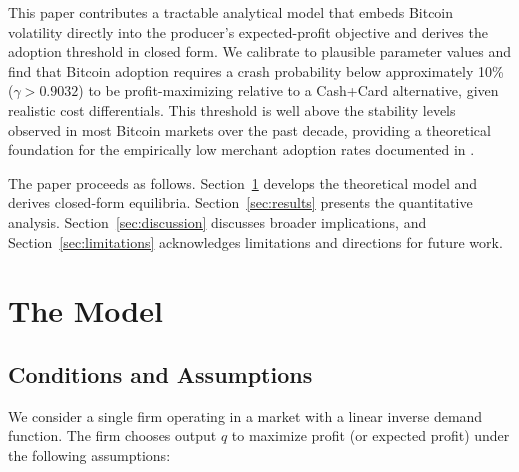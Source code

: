 \documentclass{article}
\begin{document}
This paper contributes a tractable analytical model that embeds Bitcoin
volatility directly into the producer's expected-profit objective and derives
the adoption threshold in closed form.
We calibrate to plausible parameter values and find that Bitcoin adoption
requires a crash probability below approximately 10\% ($\gamma > 0.9032$) to
be profit-maximizing relative to a Cash+Card alternative, given realistic cost
differentials.
This threshold is well above the stability levels observed in most Bitcoin
markets over the past decade, providing a theoretical foundation for the
empirically low merchant adoption rates documented in \citet{catalini2016}.

The paper proceeds as follows.
Section~\ref{sec:model} develops the theoretical model and derives
closed-form equilibria.
Section~\ref{sec:results} presents the quantitative analysis.
Section~\ref{sec:discussion} discusses broader implications, and
Section~\ref{sec:limitations} acknowledges limitations and directions for
future work.

\section{The Model}
\label{sec:model}

\subsection{Conditions and Assumptions}
\label{sec:assumptions}

We consider a single firm operating in a market with a linear inverse demand
function.
The firm chooses output $q$ to maximize profit (or expected profit) under the
following assumptions:
\end{document}
